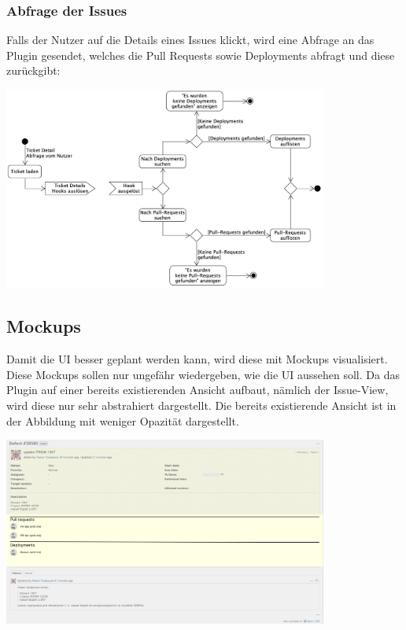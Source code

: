 \begin{minipage}{\textwidth}
  \subsubsection{Abfrage der Issues}
  Falls der Nutzer auf die Details eines Issues klickt, wird eine Abfrage an das Plugin gesendet, welches die Pull Requests sowie
  Deployments abfragt und diese zurückgibt: \newline
  \begin{center}
    \includegraphics[width=0.8\textwidth]{images/activity/issues-view.png}
    \label{fig:activity_issues}
  \end{center}
\end{minipage}

\begin{minipage}{\textwidth}
  \subsection{Mockups}
  Damit die UI besser geplant werden kann, wird diese mit Mockups visualisiert. Diese Mockups sollen
  nur ungefähr wiedergeben, wie die UI aussehen soll. Da das Plugin auf einer bereits existierenden 
  Ansicht aufbaut, nämlich der Issue-View, wird diese nur sehr abstrahiert dargestellt. \newline
  Die bereits existierende Ansicht ist in der Abbildung mit weniger Opazität dargestellt. \newline
  \begin{center}
    \includegraphics[width=0.8\textwidth]{images/mockup/details.png}
    \label{fig:mockup_details}
  \end{center}
\end{minipage}

